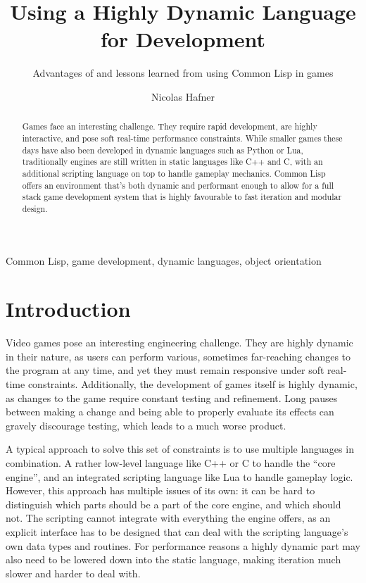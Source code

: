 \documentclass[a4paper]{paper}
\title{Using a Highly Dynamic Language for Development}
\subtitle{Advantages of and lessons learned from using Common Lisp in games}
\author{Nicolas Hafner}
\begin{document}
\twocolumn[\maketitle]

\begin{abstract}
  Games face an interesting challenge. They require rapid development, are highly interactive, and pose soft real-time performance constraints. While smaller games these days have also been developed in dynamic languages such as Python or Lua, traditionally engines are still written in static languages like C++ and C, with an additional scripting language on top to handle gameplay mechanics. Common Lisp offers an environment that's both dynamic and performant enough to allow for a full stack game development system that is highly favourable to fast iteration and modular design.
\end{abstract}
\begin{keywords}
  Common Lisp, game development, dynamic languages, object orientation
\end{keywords}

\def\abovecaptionskip{1pt}
\def\listingautorefname{Listing}
\def\figureautorefname{Figure}

\section{Introduction}
Video games pose an interesting engineering challenge. They are highly dynamic in their nature, as users can perform various, sometimes far-reaching changes to the program at any time, and yet they must remain responsive under soft real-time constraints. Additionally, the development of games itself is highly dynamic, as changes to the game require constant testing and refinement. Long pauses between making a change and being able to properly evaluate its effects can gravely discourage testing, which leads to a much worse product.

A typical approach to solve this set of constraints is to use multiple languages in combination. A rather low-level language like C++ or C to handle the ``core engine'', and an integrated scripting language like Lua to handle gameplay logic. However, this approach has multiple issues of its own: it can be hard to distinguish which parts should be a part of the core engine, and which should not. The scripting cannot integrate with everything the engine offers, as an explicit interface has to be designed that can deal with the scripting language's own data types and routines. For performance reasons a highly dynamic part may also need to be lowered down into the static language, making iteration much slower and harder to deal with.
\end{document}
